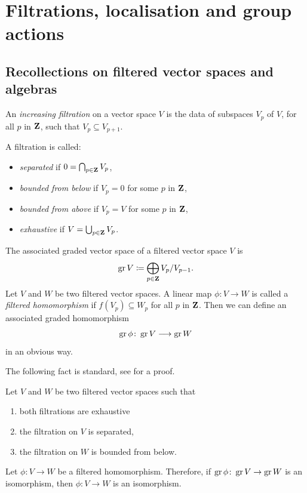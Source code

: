 \section{Filtrations, localisation and group actions} \label{section:localisation-filtration}

\subsection{Recollections on filtered vector spaces and algebras}

An \emph{increasing filtration} on a vector space $V$ is the data of subspaces $V_p$ of $V$, for all $p$ in $\mathbf{Z}$, such that $V_p \subseteq V_{p+1}$.

A filtration is called:
\begin{itemize}
	\item \emph{separated} if $0 = \bigcap_{p \in \mathbf{Z}} V_p$,
	
	\item \emph{bounded from below} if $V_p = 0$ for some $p$ in $\mathbf{Z}$,
	
	\item \emph{bounded from above} if $V_p = V$ for some $p$ in $\mathbf{Z}$,
	
	\item \emph{exhaustive} if $V = \bigcup_{p \in \mathbf{Z}} V_p$.
\end{itemize}

The associated graded vector space of a filtered vector space $V$ is 
\[ \operatorname{gr} V \coloneqq \bigoplus_{p \in \mathbf{Z}} V_p / V_{p - 1}. \]
Let $V$ and $W$ be two filtered vector spaces. A linear map $\phi \colon V \rightarrow W$ is called a \emph{filtered homomorphism} if $f(V_p) \subseteq W_p$ for all $p$ in $\mathbf{Z}$. Then we can define an associated graded homomorphism
\[ \operatorname{gr} \phi \colon \operatorname{gr} V \longrightarrow \operatorname{gr} W \]
in an obvious way.

The following fact is standard, see \cite[Lemma 6.8]{kamnitzer2022hamiltonian} for a proof.

\begin{lemma} \label{lemma:quantisation-iso}
	Let $V$ and $W$ be two filtered vector spaces such that
	\begin{enumerate}
		\item both filtrations are exhaustive
		
		\item the filtration on $V$ is separated,
		
		\item the filtration on $W$ is bounded from below.
	\end{enumerate} 
	Let $\phi \colon V \rightarrow W$ be a filtered homomorphism. Therefore, if $\operatorname{gr} \phi \colon \operatorname{gr} V \rightarrow \operatorname{gr} W$ is an isomorphism, then $\phi \colon V \rightarrow W$ is an isomorphism.
\end{lemma}

